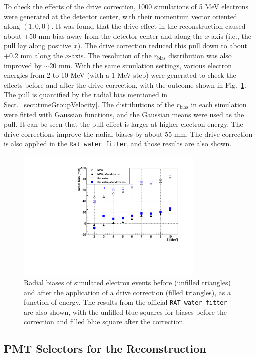 To check the effects of the drive correction, 1000 simulations of 5 MeV electrons were generated at the detector center, with their momentum vector oriented along $(1,0,0)$. It was found that the drive effect in the reconstruction caused about +50 mm bias away from the detector center and along the $x$-axis (i.e., the pull lay along positive $x$). The drive correction reduced this pull down to about +0.2 mm along the $x$-axis. The resolution of the $r_\mathrm{bias}$ distribution was also improved by $\sim$20 mm. With the same simulation settings, various electron energies from 2 to 10 MeV (with a 1 MeV step) were generated to check the effects before and after the drive correction, with the outcome shown in Fig.~\ref{drivecorVsEnergy}. The pull is quantified by the radial bias mentioned in Sect.~\ref{sect:tuneGroupVelocity}. The distributions of the $r_\mathrm{bias}$ in each simulation were fitted with Gaussian functions, and the Gaussian means were used as the pull. It can be seen that the pull effect is larger at higher electron energy. The drive corrections improve the radial biases by about 55 mm. The drive correction is also applied in the \texttt{Rat water fitter}, and those results are also shown.
\begin{figure}[!htb]
	\centering
	\includegraphics[width=9cm]{pullEffectVsEnergy.pdf}
	\caption[Radial biases of simulated electron events as a function of energy.]{Radial biases of simulated electron events before (unfilled triangles) and after the application of a drive correction (filled triangles), as a function of energy. The results from the official \texttt{RAT water fitter} are also shown, with the unfilled blue squares for biases before the correction and filled blue square after the correction.}
	\label{drivecorVsEnergy}
\end{figure}

\subsection{PMT Selectors for the Reconstruction}\label{sect:PMTselector}

